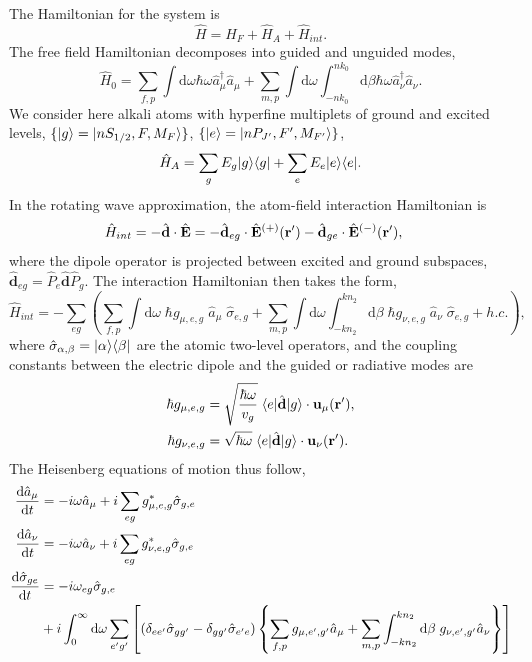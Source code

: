 \documentclass[preprint,aps,pra,onecolumn]{revtex4-1} %
\begin{document}
The Hamiltonian for the system is
\begin{equation}
\hat{H} = \hat{H}_F+\hat{H}_A + \hat{H}_{int}.
\end{equation}
The free field Hamiltonian decomposes into guided and unguided modes, 
\begin{equation}
\hat{H}_0 = \sum_{f,p}\int \mathrm{d}\omega \hbar \omega \hat{a}^\dagger_\mu \hat{a}_\mu +\sum_{m,p} \int \mathrm{d}\omega  \int_{-nk_0}^{nk_0} \mathrm{d}\beta \hbar \omega \hat{a}^\dagger_\nu \hat{a}_\nu.
\end{equation}
We consider here alkali atoms with hyperfine multiplets of ground and excited levels, $\{ \lvert{g}\rangle=\lvert{nS_{1/2}, F, M_F}\rangle\}$, $\{ \lvert{e}\rangle =\lvert{nP_{J'}, F', M_{F'}}\rangle\}$,
\begin{equation}
\hat{H}_A  = \sum_g E_g \lvert{g}\rangle\langle{g}\rvert + \sum_e E_e \lvert{e}\rangle\langle{e}\rvert.
\end{equation}
In the rotating wave approximation, the atom-field interaction Hamiltonian is
\begin{align}
\hat{H}_{int} &= -\hat{\mathbf{d}}\cdot \hat{\mathbf{E}} = -\hat{\mathbf{d}}_{eg}\cdot \hat{\mathbf{E}}^{(+)}(\mathbf{r}')-\hat{\mathbf{d}}_{ge}\cdot \hat{\mathbf{E}}^{(-)}(\mathbf{r}'),
\end{align}
where the dipole operator is projected between excited and ground subspaces, $\hat{\mathbf{d}}_{eg}= \hat{P}_e \hat{\mathbf{d}} \hat{P}_g $. The interaction Hamiltonian then takes the form, 
\begin{equation}
\hat{H}_{int} = -\sum_{eg} \left(\sum_{f,p} \int\mathrm{d}\omega \; \hbar g_{\mu, e,g}\; \hat{a}_\mu  \; \hat{\sigma}_{e,g}+ \sum_{m,p} \int\mathrm{d}\omega \int_{-kn_2}^{kn_2}\mathrm{d}\beta \;  \hbar g_{\nu, e,g}\; \hat{a}_\nu \; \hat{\sigma}_{e,g}+  h.c.\right),
\end{equation}
where $\hat{\sigma}_{\alpha,\beta}= \lvert{\alpha}\rangle\langle{\beta}\rvert$ are the atomic two-level operators, and the coupling constants between the electric dipole and the guided or radiative modes are
\begin{align}
\hbar g_{\mu, e,g} &= \sqrt{\frac{\hbar \omega}{v_g}}\; \langle{e}\rvert \hat{\mathbf{d}} \lvert{g}\rangle \cdot\mathbf{u}_\mu (\mathbf{r}'), \\
\hbar g_{\nu, e,g} &= \sqrt{\hbar \omega} \; \langle{e}\rvert \hat{\mathbf{d}} \lvert{g}\rangle \cdot \mathbf{u}_\nu (\mathbf{r}') .
\end{align}
The Heisenberg equations of motion thus follow,
\begin{align}
\frac{{\mathrm d} {\hat{a}_\mu}}{{\mathrm d}t} &= -i\omega \hat{a}_\mu +i\sum_{eg} g_{\mu, e,g}^* \hat{\sigma}_{g,e} \label{eq:da}\\
\frac{{\mathrm d} {\hat{a}_\nu}}{{\mathrm d}t} &= -i\omega \hat{a}_\nu +i\sum_{eg} g_{\nu, e,g}^*  \hat{\sigma}_{g,e} \label{eq:danu}\\
\frac{{\mathrm d} {\hat{\sigma}_{ge}}}{{\mathrm d}t} &= -i\omega_{eg} \hat{\sigma}_{g,e} \nonumber\\
&+ i\int_0^{\infty}\mathrm{d}\omega \sum_{e'g'} \left[ (\delta_{ee'} \hat{\sigma}_{gg'} - \delta_{gg'} \hat{\sigma}_{e'e}) \left\{ \sum_{f,p}  g_{\mu, e',g'}\hat{a}_\mu +\sum_{m,p}  \int_{-kn_2}^{kn_2}\mathrm{d}\beta \; g_{\nu, e',g'} \hat{a}_\nu \right\}   \right]
 \label{eq:dsigma} 
\end{align}
\end{document}
